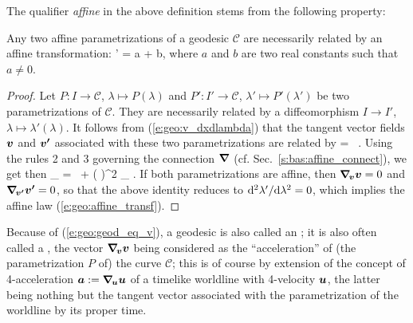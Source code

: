 The qualifier \emph{affine} in the above definition stems from the following
property:
\begin{greybox}
Any two affine parametrizations of a geodesic $\mathcal{C}$ are necessarily
related by an affine transformation:
\be \label{e:geo:affine_transf}
    \lambda' = a \lambda + b,
\ee
where $a$ and $b$ are two real constants such that $a\not = 0$.
\end{greybox}
\begin{proof}
Let $P: I \to  \mathcal{C}$, $\lambda\mapsto P(\lambda)$ and
$P': I'\to \mathcal{C}$,
$\lambda'\mapsto P'(\lambda')$ be two
parametrizations of $\mathcal{C}$. They are necessarily related by a
diffeomorphism $I\to I'$, $\lambda \mapsto \lambda'(\lambda)$. It follows
from (\ref{e:geo:v_dxdlambda}) that the tangent vector fields $\bm{v}$ and $\bm{v'}$
associated with these two parametrizations are related by
\be  \label{e:geo:change_tangent_vector}
     =  \,  .
\ee
Using the rules 2 and 3 governing the connection $\bm{\nabla}$ (cf. Sec.~\ref{s:bas:affine_connect}),
we get then
\be \label{e:geo:acc_v_acc_vp}
    \wnab_{\!} =  \, 
    + \left(  \right)^2 \wnab_{\!} .
\ee
If both parametrizations are affine, then $\bm{\nabla}_{\!\bm{v}}\bm{v} = 0$ and
$\bm{\nabla}_{\!\bm{v'}}\bm{v'} = 0$, so that the above identity reduces to
${\mathrm{d}^2\lambda'}/{\mathrm{d}\lambda^2} = 0$, which implies
the affine law (\ref{e:geo:affine_transf}).
\end{proof}

\begin{remark}
Because of (\ref{e:geo:geod_eq_v}), a geodesic is also called
an ; it is also often called
a , the
vector $\bm{\nabla}_{\!\bm{v}}\bm{v}$ being considered as the
``acceleration'' of (the parametrization $P$ of) the
curve $\mathcal{C}$; this is of course by extension of the concept of
4-acceleration $\bm{a} := \bm{\nabla}_{\!\bm{u}}\bm{u}$ of a timelike worldline
with 4-velocity $\bm{u}$, the latter being nothing but the tangent vector associated with
the parametrization of the worldline by its proper time.
\end{remark}

